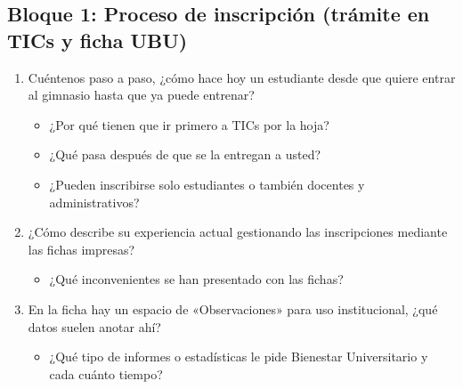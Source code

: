 \subsection*{Bloque 1: Proceso de inscripción (trámite en TICs y ficha UBU)}
\begin{enumerate}[resume*=preguntas]
  \item Cuéntenos paso a paso, ¿cómo hace hoy un estudiante desde que quiere entrar al gimnasio hasta que ya puede entrenar?
  \begin{itemize}
    \item[R:] ¿Por qué tienen que ir primero a TICs por la hoja?
    \item[R:] ¿Qué pasa después de que se la entregan a usted?
    \item[R:] ¿Pueden inscribirse solo estudiantes o también docentes y administrativos?
  \end{itemize}
  \item ¿Cómo describe su experiencia actual gestionando las inscripciones mediante las fichas impresas?
  \begin{itemize}
    \item[R:] ¿Qué inconvenientes se han presentado con las fichas?
  \end{itemize}
  \item En la ficha hay un espacio de «Observaciones» para uso institucional, ¿qué datos suelen anotar ahí?
  \begin{itemize}
    \item[R:] ¿Qué tipo de informes o estadísticas le pide Bienestar Universitario y cada cuánto tiempo?
  \end{itemize}
\end{enumerate}

